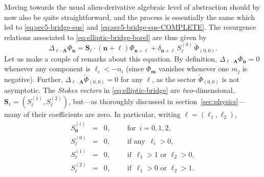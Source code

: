 \documentclass[11pt,a4paper]{article}
\newcommand{\be}{\begin{equation}}
\newcommand{\ee}{\end{equation}}
\newcommand{\bea}{\begin{eqnarray}}
\newcommand{\eea}{\end{eqnarray}}
\begin{document}
Moving towards the usual alien-derivative algebraic level of abstraction should by now also be quite straightforward, and the process is essentially the same which led to \eqref{eq:sec5-bridge-eqs} and \eqref{eq:sec5-bridge-eqs-COMPLETE}. The resurgence relations associated to \eqref{eq:elliptic-bridge-borel} are thus given by
%
\be
\label{eq:elliptic-bridge}
\Delta_{\boldsymbol{\ell} \cdot \boldsymbol{A}} \Phi_{\boldsymbol{n}} =  \boldsymbol{S}_{\boldsymbol{\ell}} \cdot \left(\boldsymbol{n}+\boldsymbol{\ell}\right) \Phi_{\boldsymbol{n}+\boldsymbol{\ell}} + \delta_{\boldsymbol{n}+\boldsymbol{\ell}}\, S^{(0)}_{\boldsymbol{\ell}}\, \widetilde{\Phi}_{(0,0)}.
\ee
%
\noindent
Let us make a couple of remarks about this equation. By definition, $\Delta_{\boldsymbol{\ell} \cdot \boldsymbol{A}} \Phi_{\boldsymbol{n}} = 0$ whenever any component is $\ell_i < - n_i$ (since $\Phi_{\boldsymbol{m}}$ vanishes whenever one $m_j$ is negative). Further, $\Delta_{\boldsymbol{\ell} \cdot \boldsymbol{A}} \widetilde{\Phi}_{(0,0)} = 0$ for any $\boldsymbol{\ell}$, as the sector $\widetilde{\Phi}_{(0,0)}$ is not asymptotic. The \textit{Stokes vectors} in \eqref{eq:elliptic-bridge} are \textit{two}-dimensional, $\boldsymbol{S}_{\boldsymbol{\ell}} = ( S_{\boldsymbol{\ell}}^{(1)}, S_{\boldsymbol{\ell}}^{(2)} )$, but---as thoroughly discussed in section~\ref{sec:physics}---many of their coefficients are zero. In particular, writing $\boldsymbol{\ell} =  ( \ell_1,\ell_2 )$,
%
\bea
\label{eq.S.coeff.a}
S^{(i)}_{\boldsymbol{0}} &=& 0, \qquad \text{ for }\, i=0,1,2, \\
\label{eq.S.coeff.b}
S^{(0)}_{\boldsymbol{\ell}} &=& 0, \qquad \text{ if any }\, \ell_i>0, \\
\label{eq.S.coeff.c}
S^{(1)}_{\boldsymbol{\ell}} &=& 0, \qquad \text{ if }\, \ell_1>1 \text{  or  } \ell_2>0, \\
\label{eq.S.coeff.d}
S^{(2)}_{\boldsymbol{\ell}} &=& 0, \qquad \text{ if }\, \ell_1>0 \text{  or  } \ell_2>1.
\eea
%
\noindent
\end{document}

